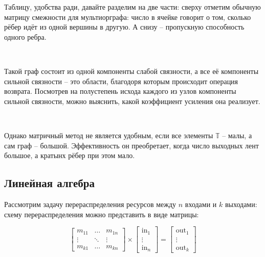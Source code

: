 \vspace{0.5in}

Таблицу, удобства ради, давайте разделим на две части: сверху отметим обычную матрицу смежности для мультиорграфа: число в ячейке говорит о том, сколько рёбер идёт из одной вершины в другую. А снизу -- пропускную способность одного ребра.

\

Такой граф состоит из одной компоненты слабой связности, а все её компоненты сильной связности -- это области, благодоря которым происходит операция возврата. Посмотрев на полустепень исхода каждого из узлов компоненты сильной связности, можно выяснить, какой коэффициент усиления она реализует.

\

Однако матричный метод не является удобным, если все элементы $\mathbb{T}$ -- малы, а сам граф -- большой. Эффективность он преобретает, когда число выходных лент большое, а кратынх рёбер при этом мало.













\vspace{0.5in}

\subsection{Линейная алгебра}

Рассмотрим задачу перераспределения ресурсов между $n$ входами и $k$ выходами: схему перераспределения можно представить в виде матрицы:

$$
\left[
\begin{matrix}
	m_{11} & \ldots & m_{1n} \\
	\vdots & \ddots & \vdots \\
	m_{k1} & \ldots & m_{kn}
\end{matrix}
\right]
\times
\left[
\begin{matrix}
	\text{in}_1 \\
	\vdots \\
	\text{in}_n
\end{matrix}
\right]
=
\left[
\begin{matrix}
	\text{out}_1 \\
	\vdots \\
	\text{out}_k
\end{matrix}
\right]
$$

